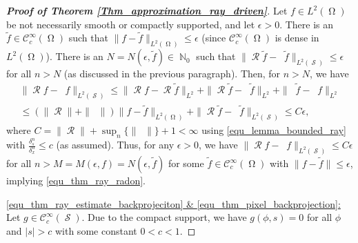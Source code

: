 \documentclass[11pt,reqno]{amsart}
\DeclareMathOperator{\NN}{\mathbb{N}}
\DeclareMathOperator{\Radon}{\mathcal{R}}
\DeclareMathOperator{\RayRadonN}{\mathcal{R}^\mathrm{rd}_{\delta^n}}
\DeclareMathOperator{\imgdom}{\Omega}
\DeclareMathOperator{\sinodom}{\mathcal{S}}
\numberwithin{theorem}{section}
\theoremstyle{remark}
\begin{document}
\begin{proof}[\textbf{Proof of Theorem \ref{Thm_approximation_ray_driven}}]
    Let $f\in L^2(\imgdom)$ be not necessarily smooth or compactly supported, and let $\epsilon>0$. There is an $\tilde f\in \mathcal{C}^\infty_c(\imgdom)$ such that $\|f-\tilde f\|_{L^2(\imgdom)}\leq \epsilon$ (since $\mathcal{C}^\infty_c(\imgdom)$ is dense in $L^2(\imgdom)$).  There is an $N=N(\epsilon,\tilde f)\in \NN_0$ such that $\|\Radon \tilde f - \RayRadonN\tilde f\|_{L^2(\sinodom)}\leq \epsilon$ for all $n>N$ (as discussed in the previous paragraph). Then, for $n>N$, we have
   \begin{multline} \label{equ_proof_diagonal_argument}
        \|\Radon f-\RayRadonN f\|_{L^2(\sinodom)}\leq \|\Radon f-\Radon \tilde f\|_{L^2} +\|\Radon \tilde f - \RayRadonN \tilde f  \|_{L^2}+\|\RayRadonN \tilde f -\RayRadonN f \|_{L^2}  
        \\
        \leq
        (\|\Radon\|+\|\RayRadonN\|) \|f-\tilde f\|_{L^2(\imgdom)} + \|\Radon \tilde f - \RayRadonN \tilde f  \|_{L^2(\sinodom)} \leq  C \epsilon,
    \end{multline}
    where $C=\|\Radon\|+\sup_n\{\|\RayRadonN\|\}+1<\infty$ using \eqref{equ_lemma_bounded_ray} with $\frac{\delta_s^n}{\delta_x^n}\leq c$ (as assumed). Thus, for any $\epsilon>0$, we have  $\|\Radon f- \RayRadonN f\|_{L^2(\sinodom)}\leq C \epsilon$ for all  $n>M=M(\epsilon,f)=N(\epsilon,\widetilde f)$ for some $\widetilde f \in \mathcal{C}^\infty_c(\imgdom)$ with $\|f-\widetilde f\|\leq \epsilon$, implying \eqref{equ_thm_ray_radon}.








\underline{\eqref{equ_thm_ray_estimate_backprojeciton} \& \eqref{equ_thm_pixel_backprojection}:}
Let $g\in \mathcal{C}^\infty_c(\sinodom)$. Due to the compact support, we have $g(\phi,s)=0$ for all $\phi$ and $|s|>c$ with some constant $0<c<1$.


\end{proof}
\end{document}
